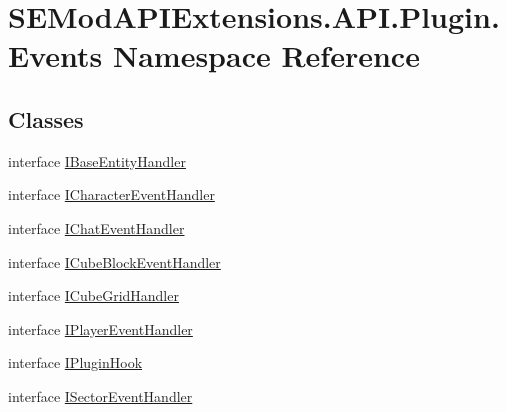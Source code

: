 \hypertarget{namespace_s_e_mod_a_p_i_extensions_1_1_a_p_i_1_1_plugin_1_1_events}{}\section{S\+E\+Mod\+A\+P\+I\+Extensions.\+A\+P\+I.\+Plugin.\+Events Namespace Reference}
\label{namespace_s_e_mod_a_p_i_extensions_1_1_a_p_i_1_1_plugin_1_1_events}
\subsection*{Classes}
\begin{DoxyCompactItemize}
\item 
interface \hyperlink{interface_s_e_mod_a_p_i_extensions_1_1_a_p_i_1_1_plugin_1_1_events_1_1_i_base_entity_handler}{I\+Base\+Entity\+Handler}
\item 
interface \hyperlink{interface_s_e_mod_a_p_i_extensions_1_1_a_p_i_1_1_plugin_1_1_events_1_1_i_character_event_handler}{I\+Character\+Event\+Handler}
\item 
interface \hyperlink{interface_s_e_mod_a_p_i_extensions_1_1_a_p_i_1_1_plugin_1_1_events_1_1_i_chat_event_handler}{I\+Chat\+Event\+Handler}
\item 
interface \hyperlink{interface_s_e_mod_a_p_i_extensions_1_1_a_p_i_1_1_plugin_1_1_events_1_1_i_cube_block_event_handler}{I\+Cube\+Block\+Event\+Handler}
\item 
interface \hyperlink{interface_s_e_mod_a_p_i_extensions_1_1_a_p_i_1_1_plugin_1_1_events_1_1_i_cube_grid_handler}{I\+Cube\+Grid\+Handler}
\item 
interface \hyperlink{interface_s_e_mod_a_p_i_extensions_1_1_a_p_i_1_1_plugin_1_1_events_1_1_i_player_event_handler}{I\+Player\+Event\+Handler}
\item 
interface \hyperlink{interface_s_e_mod_a_p_i_extensions_1_1_a_p_i_1_1_plugin_1_1_events_1_1_i_plugin_hook}{I\+Plugin\+Hook}
\item 
interface \hyperlink{interface_s_e_mod_a_p_i_extensions_1_1_a_p_i_1_1_plugin_1_1_events_1_1_i_sector_event_handler}{I\+Sector\+Event\+Handler}
\end{DoxyCompactItemize}
